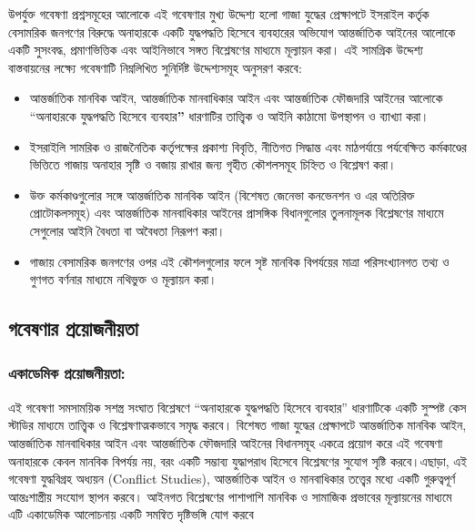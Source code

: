 উপর্যুক্ত গবেষণা প্রশ্নসমূহের আলোকে এই গবেষণার মুখ্য উদ্দেশ্য হলো গাজা যুদ্ধের প্রেক্ষাপটে ইসরাইল কর্তৃক বেসামরিক জনগণের বিরুদ্ধে অনাহারকে একটি যুদ্ধপদ্ধতি হিসেবে ব্যবহারের অভিযোগ আন্তর্জাতিক আইনের আলোকে একটি সুসংবদ্ধ, প্রমাণভিত্তিক এবং আইনিভাবে সঙ্গত বিশ্লেষণের মাধ্যমে মূল্যায়ন করা। এই সামগ্রিক উদ্দেশ্য বাস্তবায়নের লক্ষ্যে গবেষণাটি নিম্নলিখিত সুনির্দিষ্ট উদ্দেশ্যসমূহ অনুসরণ করবে:

\begin{itemize}
\item
  আন্তর্জাতিক মানবিক আইন, আন্তর্জাতিক মানবাধিকার আইন এবং আন্তর্জাতিক ফৌজদারি আইনের আলোকে ``অনাহারকে যুদ্ধপদ্ধতি হিসেবে ব্যবহার\textbf{''} ধারণাটির তাত্ত্বিক ও আইনি কাঠামো উপস্থাপন ও ব্যাখ্যা করা।
\item
  ইসরাইলি সামরিক ও রাজনৈতিক কর্তৃপক্ষের প্রকাশ্য বিবৃতি, নীতিগত সিদ্ধান্ত এবং মাঠপর্যায়ে পর্যবেক্ষিত কর্মকাণ্ডের ভিত্তিতে গাজায় অনাহার সৃষ্টি ও বজায় রাখার জন্য গৃহীত কৌশলসমূহ চিহ্নিত ও বিশ্লেষণ করা।
\item
  উক্ত কর্মকাণ্ডগুলোর সঙ্গে আন্তর্জাতিক মানবিক আইন (বিশেষত জেনেভা কনভেনশন ও এর অতিরিক্ত প্রোটোকলসমূহ) এবং আন্তর্জাতিক মানবাধিকার আইনের প্রাসঙ্গিক বিধানগুলোর তুলনামূলক বিশ্লেষণের মাধ্যমে সেগুলোর আইনি বৈধতা বা অবৈধতা নিরূপণ করা।
\item
  গাজায় বেসামরিক জনগণের ওপর এই কৌশলগুলোর ফলে সৃষ্ট মানবিক বিপর্যয়ের মাত্রা পরিসংখ্যানগত তথ্য ও গুণগত বর্ণনার মাধ্যমে নথিভুক্ত ও মূল্যায়ন করা।
\end{itemize}

\subsection{গবেষণার প্রয়োজনীয়তা}\label{ux997ux9acux9b7ux9a3ux9b0-ux9aaux9b0ux9dfux99cux9a8ux9dfux9a4}

\subsubsection{একাডেমিক প্রয়োজনীয়তা:}\label{ux98fux995ux9a1ux9aeux995-ux9aaux9b0ux9dfux99cux9a8ux9dfux9a4}

এই গবেষণা সমসাময়িক সশস্ত্র সংঘাত বিশ্লেষণে ``অনাহারকে যুদ্ধপদ্ধতি হিসেবে ব্যবহার'' ধারণাটিকে একটি সুস্পষ্ট কেস স্টাডির মাধ্যমে তাত্ত্বিক ও বিশ্লেষণাত্মকভাবে সমৃদ্ধ করবে। বিশেষত গাজা যুদ্ধের প্রেক্ষাপটে আন্তর্জাতিক মানবিক আইন, আন্তর্জাতিক মানবাধিকার আইন এবং আন্তর্জাতিক ফৌজদারি আইনের বিধানসমূহ একত্রে প্রয়োগ করে এই গবেষণা অনাহারকে কেবল মানবিক বিপর্যয় নয়, বরং একটি সম্ভাব্য যুদ্ধাপরাধ হিসেবে বিশ্লেষণের সুযোগ সৃষ্টি করবে।এছাড়া, এই গবেষণা যুদ্ধবিগ্রহ অধ্যয়ন (Conflict Studies), আন্তর্জাতিক আইন ও মানবাধিকার তত্ত্বের মধ্যে একটি গুরুত্বপূর্ণ আন্তঃশাস্ত্রীয় সংযোগ স্থাপন করবে। আইনগত বিশ্লেষণের পাশাপাশি মানবিক ও সামাজিক প্রভাবের মূল্যায়নের মাধ্যমে এটি একাডেমিক আলোচনায় একটি সমন্বিত দৃষ্টিভঙ্গি যোগ করবে

